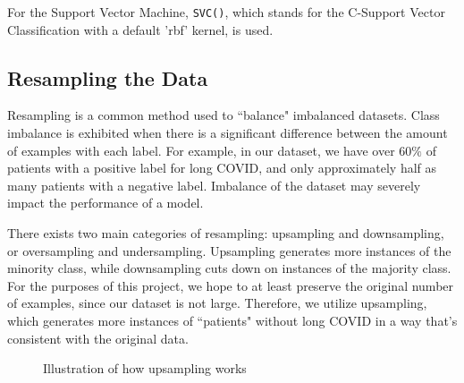 \documentclass{article}
\begin{document}
For the Support Vector Machine, \texttt{SVC()}, which stands for the C-Support Vector Classification with a default 'rbf' kernel, is used. 

\subsection{Resampling the Data}

Resampling is a common method used to ``balance" imbalanced datasets. Class imbalance is exhibited when there is a significant difference between the amount of examples with each label. For example, in our dataset, we have over $60\%$ of patients with a positive label for long COVID, and only approximately half as many patients with a negative label. Imbalance of the dataset may severely impact the performance of a model.

There exists two main categories of resampling: upsampling and downsampling, or oversampling and undersampling. Upsampling generates more instances of the minority class, while downsampling cuts down on instances of the majority class. For the purposes of this project, we hope to at least preserve the original number of examples, since our dataset is not large. Therefore, we utilize upsampling, which generates more instances of ``patients" without long COVID in a way that's consistent with the original data. 

\begin{figure}[h]
\centering
{}
\caption{Illustration of how upsampling works}
\label{fig:my_label}
\end{figure}
\end{document}
